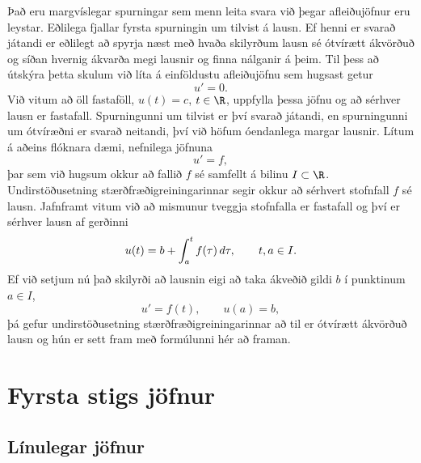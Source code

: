Það eru margvíslegar spurningar sem menn leita svara við þegar
afleiðujöfnur eru leystar.  Eðlilega fjallar fyrsta spurningin um
tilvist á lausn.  Ef henni er svarað játandi er eðlilegt að spyrja
næst með hvaða skilyrðum lausn sé ótvírætt ákvörðuð og síðan
hvernig ákvarða megi lausnir  og finna nálganir á þeim.
Til þess að útskýra þetta skulum við líta á
einföldustu afleiðujöfnu sem hugsast getur
$$u'=0.$$
Við vitum að öll fastaföll, $u(t)=c$, $t\in\R$, uppfylla þessa jöfnu
og að sérhver lausn er fastafall.
Spurningunni um tilvist er því svarað játandi, en spurningunni um ótvíræðni
er svarað neitandi, því  við höfum óendanlega margar lausnir.  Lítum á
aðeins flóknara dæmi, nefnilega jöfnuna
\begin{equation*}u'=f, \label{1.1.6}
\end{equation*}
þar sem við hugsum okkur að fallið $f$ sé samfellt á bilinu $I\subset
\R$.  Undirstöðusetning stærðfræðigreiningarinnar segir okkur að
sérhvert stofnfall $f$ sé lausn.  Jafnframt vitum við að mismunur
tveggja stofnfalla er fastafall og því er sérhver lausn af gerðinni
 \begin{equation*}
 u(t)=b+\int_a\sp t f(\tau) \, d\tau, \qquad t,a\in I.\label{1.1.7}
 \end{equation*}
Ef við setjum nú það skilyrði að lausnin eigi að taka ákveðið gildi $b$ 
í punktinum $a\in I$, 
 \begin{equation*}u'=f(t), \qquad u(a)=b,\label{1.1.8}
 \end{equation*}
þá gefur undirstöðusetning stærðfræðigreiningarinnar að til er 
ótvírætt ákvörðuð lausn og hún er sett fram með formúlunni hér að framan.

\section{Fyrsta stigs jöfnur}  


\subsection*{Línulegar jöfnur}

